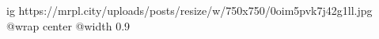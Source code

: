  
 
 
 
 

\ifcmt
  ig https://mrpl.city/uploads/posts/resize/w/750x750/0oim5pvk7j42g1ll.jpg
  @wrap center
  @width 0.9
\fi
